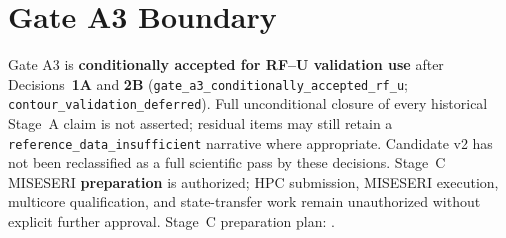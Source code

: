 \section{Gate A3 Boundary}

Gate A3 is \textbf{conditionally accepted for RF--U validation use} after Decisions~\textbf{1A} and \textbf{2B}
(\texttt{gate\_a3\_conditionally\_accepted\_rf\_u}; \texttt{contour\_validation\_deferred}).
Full unconditional closure of every historical Stage~A claim is not asserted; residual items may still retain a
\texttt{reference\_data\_insufficient} narrative where appropriate.
Candidate v2 has not been reclassified as a full scientific pass by these decisions.
Stage~C MISESERI \textbf{preparation} is authorized; HPC submission, MISESERI execution, multicore qualification,
and state-transfer work remain unauthorized without explicit further approval.
Stage~C preparation plan: .
